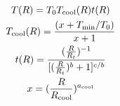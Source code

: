 \documentclass{article}
\begin{document}
\begin{gather}
  T(R)=T_0T_{\rm cool}(R)t(R)\\
  T_{\rm cool}(R)=\frac{(x+T_{\rm min}/T_0)}{x+1}\\
  t(R)=\frac{(\frac{R}{R_t})^{-1}}{[(\frac{R}{R_t})^b+1]^{c/b}}\\
  x=(\frac{R}{R_{\rm cool}})^{a_{\rm cool}}
\end{gather}
\end{document}
